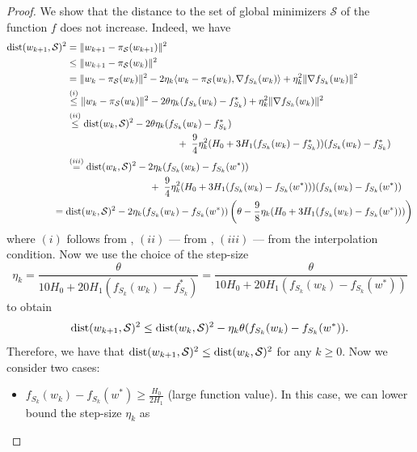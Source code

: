 \documentclass[a4paper,11pt]{article}
\newcommand{\cS}{\mathcal{S}}
\newcommand{\1}{\mathbbm{1}}
\theoremstyle{plain}
\begin{document}
\theoremaimingstochastic*
\begin{proof}
    We show that the distance to the set of global minimizers $\cS$ of the function $f$ does not increase. Indeed, we have
    \begin{align*}
        {\rm dist}(w_{k+1},\cS)^2 &= \|w_{k+1}-\pi_{\cS}(w_{k+1})\|^2\\
        &\le \|w_{k+1}-\pi_{\cS}(w_k)\|^2\\
        &= \|w_k - \pi_{\cS}(w_k)\|^2 - 2\eta_k\langle w_k-\pi_{\cS}(w_k),\nabla f_{S_k}(w_k) \rangle + \eta_k^2\|\nabla f_{S_k}(w_k)\|^2\\
        &\overset{(i)}{\le} \|w_k-\pi_{\cS}(w_k)\|^2 - 2\theta\eta_k(f_{S_k}(w_k) - f_{S_k}^*) + \eta_k^2\|\nabla f_{S_k}(w_k)\|^2\\
        &\overset{(ii)}{\le} {\rm dist}(w_k,\cS)^2 - 2\theta\eta_k(f_{S_k}(w_k)-f_{S_k}^*)\\
        &\hspace{4cm} +\; \frac{9}{4}\eta_k^2(H_0+3H_1(f_{S_k}(w_k)-f_{S_k}^*))(f_{S_k}(w_k)-f_{S_k}^*)\\
        &\overset{(iii)}{=} {\rm dist}(w_k,\cS)^2 - 2\eta_k(f_{S_k}(w_k)-f_{S_k}(w^*))\\
        &\hspace{3cm}+\; \frac{9}{4}\eta_k^2(H_0+3H_1(f_{S_k}(w_k)-f_{S_k}(w^*)))(f_{S_k}(w_k)-f_{S_k}(w^*))\\
        &\hspace{-0.5cm}={\rm dist}(w_k,\cS)^2 - 2\eta_k(f_{S_k}(w_k)-f_{S_k}(w^*))\left(\theta-\frac{9}{8}\eta_k(H_0+3H_1(f_{S_k}(w_k)-f_{S_k}(w^*)))\right)
    \end{align*}
    where $(i)$ follows from , $(ii)$ --- from , $(iii)$ --- from the interpolation condition. Now we use the choice of the step-size \[
    \eta_k = \frac{\theta}{10H_0+20H_1(f_{S_k}(w_k)-f_{S_k}^*)} = \frac{\theta}{10H_0+20H_1(f_{S_k}(w_k)-f_{S_k}(w^*))}
    \]
    to obtain
    \begin{align}\label{eq:konqjwdonqwojdqnwod}
        {\rm dist}(w_{k+1},\cS)^2 \le {\rm dist}(w_k,\cS)^2 - \eta_k\theta(f_{S_k}(w_k)-f_{S_k}(w^*)).
    \end{align}
    Therefore, we have that ${\rm dist}(w_{k+1},\cS)^2 \le {\rm dist}(w_k,\cS)^2$ for any $k\ge 0.$ Now we consider two cases:
    \begin{itemize}
        \item $f_{S_k}(w_k)-f_{S_k}(w^*)\ge \frac{H_0}{2H_1}$ (large function value). In this case, we can lower bound the step-size $\eta_k$ as

\end{itemize}
\end{proof}
\end{document}
